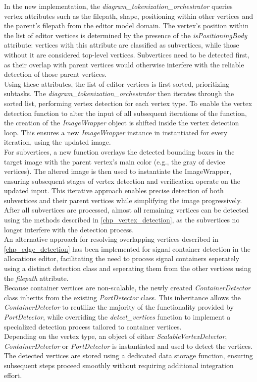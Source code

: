 In the new implementation, the \textit{diagram\_tokenization\_orchestrator} queries vertex attributes such as the filepath, shape, positioning within other vertices and the parent's filepath from the editor model domain. The vertex's position within the list of editor vertices is determined by the presence of the \textit{isPositioningBody} attribute: vertices with this attribute are classified as subvertices, while those without it are considered top-level vertices. Subvertices need to be detected first, as their overlap with parent vertices would otherwise interfere with the reliable detection of those parent vertices.\\
Using these attributes, the list of editor vertices is first sorted, prioritizing subtasks. The \textit{diagram\_tokenization\_orchestrator} then iterates through the sorted list, performing vertex detection for each vertex type. 
To enable the vertex detection function to alter the input of all subsequent iterations of the function, the creation of the \textit{ImageWrapper} object is shifted inside the vertex detection loop. This ensures a new \textit{ImageWrapper} instance in instantiated for every iteration, using the updated image.\\
For subvertices, a new function overlays the detected bounding boxes in the target image with the parent vertex's main color (e.g., the gray of device vertices). The altered image is then used to instantiate the ImageWrapper, ensuring subsequent stages of vertex detection and verification operate on the updated input. This iterative approach enables precise detection of both subvertices and their parent vertices while simplifying the image progressively.
After all subvertices are processed, almost all remaining vertices can be detected using the methods described in \ref{chp_vertex_detection}, as the subvertices no longer interfere with the detection process.\\
An alternative approach for resolving overlapping vertices described in \ref{chp_edge_detection} has been implemented for signal container detection in the allocations editor, facilitating the need to process signal containers seperately using a distinct detection class and seperating them from the other vertices using the \textit{filepath} attribute.\\
Because container vertices are non-scalable, the newly created \textit{ContainerDetector} class inherits from the existing \textit{PortDetector} class. This inheritance allows the \textit{ContainerDetector} to reutilize the majority of the functionality provided by \textit{PortDetector}, while overriding the \textit{detect\_vertices} function to implement a specialized detection process tailored to container vertices.\\
Depending on the vertex type, an object of either \textit{ScalableVertexDetector}, \textit{ContainerDetector} or \textit{PortDetector} is instantiated and used to detect the vertices.\\
The detected vertices are stored using a dedicated data storage function, ensuring subsequent steps proceed smoothly without requiring additional integration effort.

